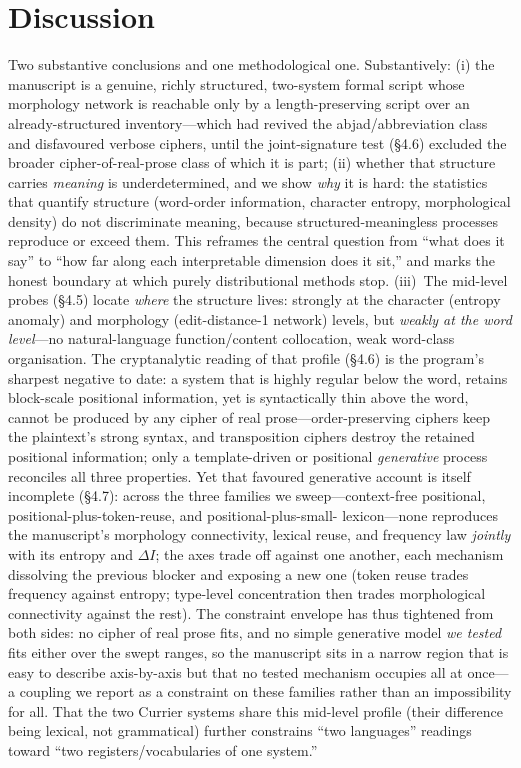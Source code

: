 \documentclass[11pt]{article}
\begin{document}
\section{Discussion}
Two substantive conclusions and one methodological one. Substantively: (i) the
manuscript is a genuine, richly structured, two-system formal script whose morphology
network is reachable only by a length-preserving script over an already-structured
inventory---which had revived the abjad/abbreviation class and disfavoured verbose
ciphers, until the joint-signature test (\S4.6) excluded the broader
cipher-of-real-prose class of which it is part; (ii) whether that structure carries
\emph{meaning} is underdetermined, and we show \emph{why} it is hard: the statistics
that quantify structure (word-order information, character entropy, morphological
density) do not discriminate meaning, because structured-meaningless processes reproduce
or exceed them. This reframes the central question from ``what does it say'' to ``how far
along each interpretable dimension does it sit,'' and marks the honest boundary at which
purely distributional methods stop. (iii)~The mid-level probes (\S4.5) locate
\emph{where} the structure lives: strongly at the character (entropy anomaly) and
morphology (edit-distance-1 network) levels, but \emph{weakly at the word level}---no
natural-language function/content collocation, weak word-class organisation. The
cryptanalytic reading of that profile (\S4.6) is the program's sharpest negative to
date: a system that is highly regular below the word, retains block-scale positional
information, yet is syntactically thin above the word, cannot be produced by any cipher
of real prose---order-preserving ciphers keep the plaintext's strong syntax, and
transposition ciphers destroy the retained positional information; only a template-driven
or positional \emph{generative} process reconciles all three properties. Yet that
favoured generative account is itself incomplete (\S4.7): across the three families we
sweep---context-free positional, positional-plus-token-reuse, and positional-plus-small-
lexicon---none reproduces the manuscript's morphology connectivity, lexical reuse, and
frequency law \emph{jointly} with its entropy and $\Delta I$; the axes trade off against
one another, each mechanism dissolving the previous blocker and exposing a new one (token
reuse trades frequency against entropy; type-level concentration then trades morphological
connectivity against the rest). The constraint envelope has thus tightened from both
sides: no cipher of real prose fits, and no simple generative model \emph{we tested} fits
either over the swept ranges, so the manuscript sits in a narrow region that is easy to
describe axis-by-axis but that no tested mechanism occupies all at once---a coupling we
report as a constraint on these families rather than an impossibility for all. That the two Currier systems share this mid-level profile (their difference
being lexical, not grammatical) further constrains ``two languages'' readings toward ``two
registers/vocabularies of one system.''
\end{document}
